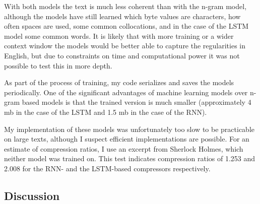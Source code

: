 With both models the text is much less coherent than with the n-gram model, although the models have still learned which byte values are characters, how often spaces are used, some common collocations, and in the case of the LSTM model some common words. It is likely that with more training or a wider context window the models would be better able to capture the regularities in English, but due to constraints on time and computational power it was not possible to test this in more depth.

As part of the process of training, my code serializes and saves the models periodically. One of the significant advantages of machine learning models over n-gram based models is that the trained version is much smaller (approximately 4 mb in the case of the LSTM and 1.5 mb in the case of the RNN).

My implementation of these models was unfortunately too slow to be practicable on large texts, although I suspect efficient implementations are possible. For an estimate of compression ratios, I use an excerpt from Sherlock Holmes, which neither model was trained on. This test indicates compression ratios of 1.253 and 2.008 for the RNN- and the LSTM-based compressors respectively.


\subsection{Discussion}


